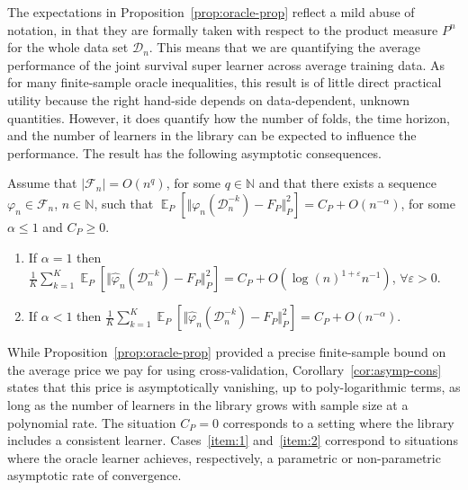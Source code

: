\documentclass[lineno]{biometrika}
\DeclareMathOperator{\E}{\mathbb{E}} %
\newcommand{\N}{\mathbb{N}}
\renewcommand{\phi}{\varphi}
\renewcommand{\epsilon}{\varepsilon}
\newcommand\bigO{\textit{O}}
\newcommand{\1}{\mathds{1}}
\newcommand{\data}{\ensuremath{\mathcal{D}}}
\begin{document}
The expectations in Proposition~\ref{prop:oracle-prop} reflect a mild
abuse of notation, in that they are formally taken with respect to the
product measure \( P^{n} \) for the whole data set \( \data_n \). This
means that we are quantifying the average performance of the joint survival super learner across
average training data. As for many finite-sample oracle inequalities,
this result is of little direct practical utility because the right
hand-side depends on data-dependent, unknown quantities. However, it
does quantify how the number of folds, the time horizon, and the
number of learners in the library can be expected to influence the
performance. The result has the following asymptotic consequences.

\begin{corollary}
  \label{cor:asymp-cons}
  Assume that \( |\mathcal{F}_n| = \bigO(n^q)\), for some
  \( q \in \N \) and that there exists a sequence
  \( \phi_n \in \mathcal{F}_n \), \( n \in \N \), such that
  \(  \E_{P}{\left[ \Vert
      \phi_n(\data_n^{-k}) - F_P \Vert_{P}^2 \right]} = C_P +
  \bigO(n^{-\alpha}) \), for some \( \alpha\leq 1 \) and
  \( C_P \geq 0 \).
  \begin{enumerate}[label=(\alph*)]
  \item\label{item:1} If $\alpha=1$ then
    \(\frac{1}{K}\sum_{k=1}^{K} \E_{P}{\left[ \Vert
        \hat{\phi}_n(\data_n^{-k}) - F_P \Vert_{P}^2 \right]} = C_P +
    \bigO(\log(n)^{1+\epsilon}n^{-1}) \), $\forall\epsilon>0$.
  \item\label{item:2} If $\alpha<1$ then
    \(\frac{1}{K}\sum_{k=1}^{K} \E_{P}{\left[ \Vert
        \hat{\phi}_n(\data_n^{-k}) - F_P \Vert_{P}^2 \right]} = C_P +
    \bigO(n^{-\alpha}) \).
  \end{enumerate}
\end{corollary}


While Proposition~\ref{prop:oracle-prop} provided a precise
finite-sample bound on the average price we pay for using
cross-validation, Corollary~\ref{cor:asymp-cons} states that this
price is asymptotically vanishing, up to poly-logarithmic terms, as
long as the number of learners in the library grows with sample size
at a polynomial rate. The situation \( C_P=0 \) corresponds to a
setting where the library includes a consistent learner.
Cases~\ref{item:1} and~\ref{item:2} correspond to situations where the
oracle learner achieves, respectively, a parametric or non-parametric
asymptotic rate of convergence.
\end{document}
